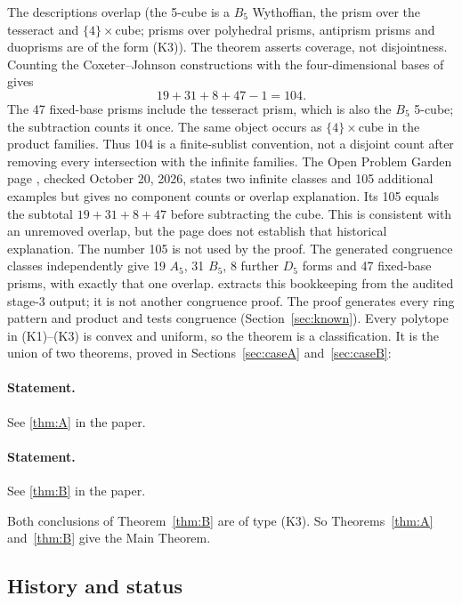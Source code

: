 \documentclass[11pt]{article}
\theoremstyle{definition}
\theoremstyle{remark}
\newcommand{\file}[1]{\path{#1}}
\begin{document}
The descriptions overlap (the 5-cube is a $B_5$ Wythoffian, the prism over
the tesseract and $\{4\}\times$cube; prisms over polyhedral prisms,
antiprism prisms and duoprisms are of the form (K3)). The theorem asserts
coverage, not disjointness. Counting the Coxeter--Johnson constructions
\cite{Coxeter1935,CoxeterRP,Johnson1966} with the four-dimensional bases
of \cite{Moller2004} gives
\[
  19+31+8+47-1=104.
\]
The 47 fixed-base prisms include the tesseract prism, which is also the
$B_5$ 5-cube; the subtraction counts it once. The same object occurs as
$\{4\}\times\mathrm{cube}$ in the product families. Thus 104 is a
finite-sublist convention, not a disjoint count after removing every
intersection with the infinite families.
The Open Problem Garden page \cite{OPG}, checked October 20, 2026,
states two infinite classes and 105 additional examples but gives no
component counts or overlap explanation. Its 105 equals the subtotal
$19+31+8+47$ before subtracting the cube. This is consistent with an
unremoved overlap, but the page does not establish that historical
explanation. The number 105 is not used by the proof.
The generated congruence classes independently give 19 $A_5$, 31 $B_5$,
8 further $D_5$ forms and 47 fixed-base prisms, with exactly that one
overlap. \file{checks/count_convention.py} extracts this bookkeeping from
the audited stage-3 output; it is not another congruence proof.
The proof generates every ring pattern and product and tests congruence
(Section~\ref{sec:known}). Every polytope in (K1)--(K3)
is convex and uniform, so the theorem is a classification. It is the
union of two theorems, proved in Sections~\ref{sec:caseA}
and~\ref{sec:caseB}:

\setcounter{theorem}{1}
\paragraph{Statement.} See \ref{thm:A} in the paper.


\setcounter{theorem}{2}
\paragraph{Statement.} See \ref{thm:B} in the paper.


Both conclusions of Theorem~\ref{thm:B} are of type (K3). So
Theorems~\ref{thm:A} and~\ref{thm:B} give the Main Theorem.

\subsection{History and status}
\end{document}
